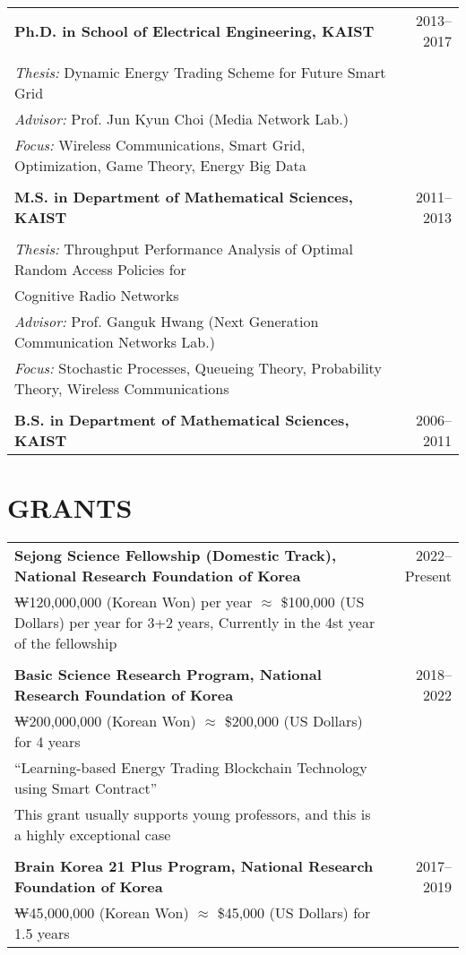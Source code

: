\documentclass[11pt,a4paper]{article}
\begin{document}
\begin{tabular}{p{14cm}r}
\textbf{Ph.D. in School of Electrical Engineering, KAIST} & 2013--2017 \\
\\
\textit{Thesis:} Dynamic Energy Trading Scheme for Future Smart Grid & \\
\textit{Advisor:} Prof. Jun Kyun Choi (Media Network Lab.) & \\
\textit{Focus:} Wireless Communications, Smart Grid, Optimization, Game Theory, Energy Big Data & \\
\\
\textbf{M.S. in Department of Mathematical Sciences, KAIST} & 2011--2013 \\
\\
\textit{Thesis:} Throughput Performance Analysis of Optimal Random Access Policies for & \\
Cognitive Radio Networks & \\
\textit{Advisor:} Prof. Ganguk Hwang (Next Generation Communication Networks Lab.) & \\
\textit{Focus:} Stochastic Processes, Queueing Theory, Probability Theory, Wireless Communications & \\
\\
\textbf{B.S. in Department of Mathematical Sciences, KAIST} & 2006--2011 \\
\end{tabular}

\section{GRANTS}

\begin{tabular}{p{14cm}r}
\textbf{Sejong Science Fellowship (Domestic Track), National Research Foundation of Korea} & 2022--Present \\
₩120,000,000 (Korean Won) per year $\approx$ \$100,000 (US Dollars) per year for 3+2 years, Currently in the 4st year of the fellowship & \\
\\
\textbf{Basic Science Research Program, National Research Foundation of Korea} & 2018--2022 \\
₩200,000,000 (Korean Won) $\approx$ \$200,000 (US Dollars) for 4 years & \\
``Learning-based Energy Trading Blockchain Technology using Smart Contract'' & \\
This grant usually supports young professors, and this is a highly exceptional case & \\
\\
\textbf{Brain Korea 21 Plus Program, National Research Foundation of Korea} & 2017--2019 \\
₩45,000,000 (Korean Won) $\approx$ \$45,000 (US Dollars) for 1.5 years & \\
\end{tabular}
\end{document}
